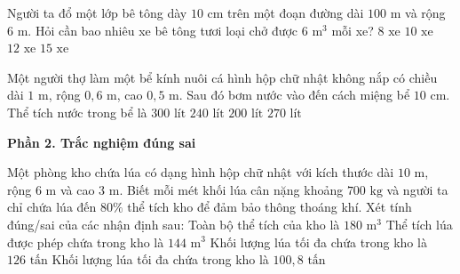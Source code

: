 \begin{ex} %
Người ta đổ một lớp bê tông dày $10\text{ cm}$ trên một đoạn đường dài $100\text{ m}$ và rộng $6\text{ m}$. Hỏi cần bao nhiêu xe bê tông tươi loại chở được $6\text{ m}^3$ mỗi xe?
\choice
{$8\text{ xe}$}
{\True $10\text{ xe}$}
{$12\text{ xe}$}
{$15\text{ xe}$}
\end{ex}

\begin{ex} %
Một người thợ làm một bể kính nuôi cá hình hộp chữ nhật không nắp có chiều dài $1\text{ m}$, rộng $0{,}6\text{ m}$, cao $0{,}5\text{ m}$. Sau đó bơm nước vào đến cách miệng bể $10\text{ cm}$. Thể tích nước trong bể là
\choice
{$300\text{ lít}$}
{\True $240\text{ lít}$}
{$200\text{ lít}$}
{$270\text{ lít}$}
\end{ex}

\textbf{Phần 2. Trắc nghiệm đúng sai}

\begin{ex} %
Một phòng kho chứa lúa có dạng hình hộp chữ nhật với kích thước dài $10\text{ m}$, rộng $6\text{ m}$ và cao $3\text{ m}$. Biết mỗi mét khối lúa cân nặng khoảng $700\text{ kg}$ và người ta chỉ chứa lúa đến $80\%$ thể tích kho để đảm bảo thông thoáng khí. Xét tính đúng/sai của các nhận định sau:
\choiceTF
{\True Toàn bộ thể tích của kho là $180\text{ m}^3$}
{\True Thể tích lúa được phép chứa trong kho là $144\text{ m}^3$}
{Khối lượng lúa tối đa chứa trong kho là $126\text{ tấn}$}
{\True Khối lượng lúa tối đa chứa trong kho là $100{,}8\text{ tấn}$}
\end{ex}

